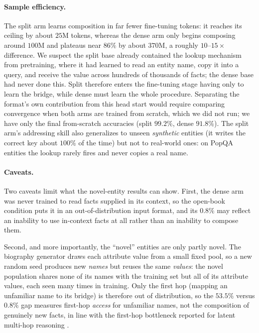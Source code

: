 \documentclass{article}
\begin{document}
\paragraph{Sample efficiency.}
The split arm learns composition in far fewer fine-tuning tokens: it reaches its ceiling by about $25$M tokens, whereas the dense arm only begins composing around $100$M and plateaus near $86\%$ by about $370$M, a roughly $10$--$15\times$ difference. We suspect the split base already contained the lookup mechanism from pretraining, where it had learned to read an entity name, copy it into a query, and receive the value across hundreds of thousands of facts; the dense base had never done this. Split therefore enters the fine-tuning stage having only to learn the bridge, while dense must learn the whole procedure. Separating the format's own contribution from this head start would require comparing convergence when both arms are trained from scratch, which we did not run; we have only the final from-scratch accuracies (split $99.2\%$, dense $91.8\%$). The split arm's addressing skill also generalizes to unseen \emph{synthetic}
entities (it writes the correct key about $100\%$ of the time) but not to real-world ones: on PopQA entities \citep{mallen2023popqa} the lookup rarely fires and never copies a real name.

\paragraph{Caveats.}
Two caveats limit what the novel-entity results can show. First, the dense arm was never trained to read facts supplied in its context, so the open-book condition puts it in an out-of-distribution input format, and its $0.8\%$ may reflect an inability to use in-context facts at all rather than an inability to compose them. 

Second, and more importantly, the ``novel'' entities are only partly novel. The biography generator draws each attribute value from a small fixed pool, so a new random seed produces new \emph{names} but reuses the same \emph{values}: the novel population shares none of its names with the training set but all of its attribute values, each seen many times in training. Only the first hop (mapping an unfamiliar name to its bridge) is therefore out of distribution, so the $53.5\%$ versus $0.8\%$ gap measures first-hop \emph{access} for unfamiliar names, not the composition of genuinely new facts, in line with the first-hop bottleneck reported for latent multi-hop reasoning \citep{yang2024latent}. 
\end{document}
